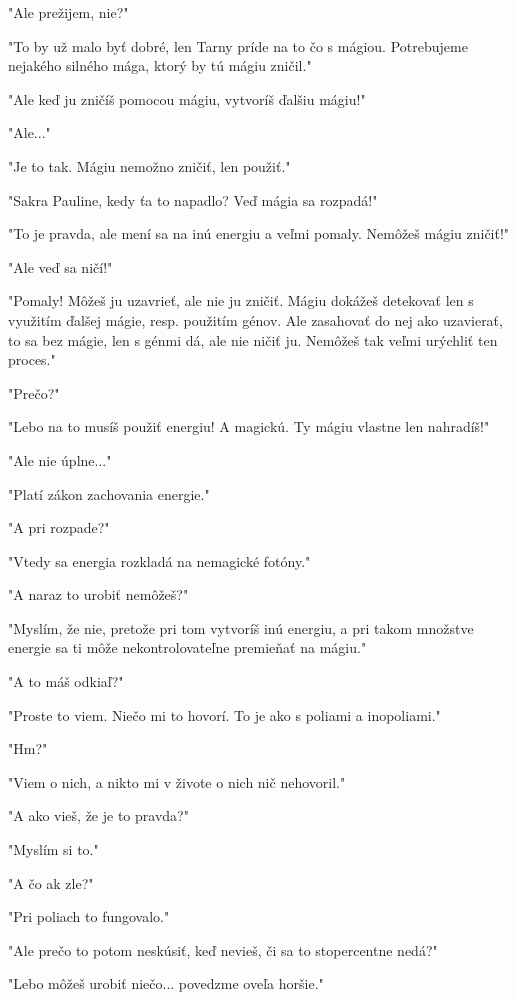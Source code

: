 \documentclass{book}
\begin{document}
"$ $Ale prežijem, nie?"$ $ 

"$ $To by už malo byť dobré, len Tarny príde na to čo s mágiou. Potrebujeme nejakého silného mága, ktorý by tú mágiu zničil."$ $ 

"$ $Ale keď ju zničíš pomocou mágiu, vytvoríš ďalšiu mágiu!"$ $ 

"$ $Ale..."$ $ 

"$ $Je to tak. Mágiu nemožno zničiť, len použiť."$ $ 

"$ $Sakra Pauline, kedy ťa to napadlo? Veď mágia sa rozpadá!"$ $ 

"$ $To je pravda, ale mení sa na inú energiu a veľmi pomaly. Nemôžeš mágiu zničiť!"$ $ 

"$ $Ale veď sa ničí!"$ $ 

"$ $Pomaly! Môžeš ju uzavrieť, ale nie ju zničiť. Mágiu dokážeš detekovať len s využitím ďalšej mágie, resp. použitím génov. Ale zasahovať do nej ako uzavierať, to sa bez mágie, len s génmi dá, ale nie ničiť ju. Nemôžeš tak veľmi urýchliť ten proces."$ $ 

"$ $Prečo?"$ $ 

"$ $Lebo na to musíš použiť energiu! A magickú. Ty mágiu vlastne len nahradíš!"$ $ 

"$ $Ale nie úplne..."$ $ 

"$ $Platí zákon zachovania energie."$ $ 

"$ $A pri rozpade?"$ $ 

"$ $Vtedy sa energia rozkladá na nemagické fotóny."$ $ 

"$ $A naraz to urobiť nemôžeš?"$ $ 

"$ $Myslím, že nie, pretože pri tom vytvoríš inú energiu, a pri takom množstve energie sa ti môže nekontrolovateľne premieňať na mágiu."$ $ 

"$ $A to máš odkiaľ?"$ $ 

"$ $Proste to viem. Niečo mi to hovorí. To je ako s poliami a inopoliami."$ $ 

"$ $Hm?"$ $ 

"$ $Viem o nich, a nikto mi v živote o nich nič nehovoril."$ $ 

"$ $A ako vieš, že je to pravda?"$ $ 

"$ $Myslím si to."$ $ 

"$ $A čo ak zle?"$ $ 

"$ $Pri poliach to fungovalo."$ $ 

"$ $Ale prečo to potom neskúsiť, keď nevieš, či sa to stopercentne nedá?"$ $ 

"$ $Lebo môžeš urobiť niečo... povedzme oveľa horšie."$ $ 
\end{document}
